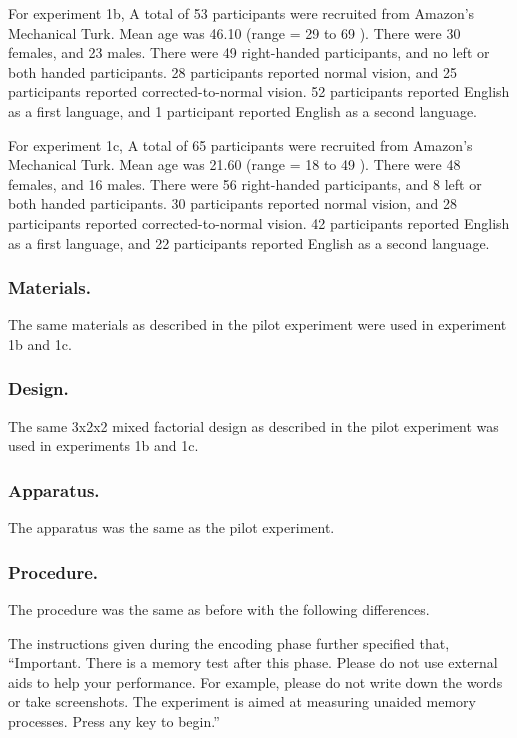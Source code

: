 \documentclass[
  man,floatsintext]{apa6}
\begin{document}
For experiment 1b, A total of 53 participants were recruited from Amazon's Mechanical Turk. Mean age was 46.10 (range = 29 to 69 ). There were 30 females, and 23 males. There were 49 right-handed participants, and no left or both handed participants. 28 participants reported normal vision, and 25 participants reported corrected-to-normal vision. 52 participants reported English as a first language, and 1 participant reported English as a second language.

For experiment 1c, A total of 65 participants were recruited from Amazon's Mechanical Turk. Mean age was 21.60 (range = 18 to 49 ). There were 48 females, and 16 males. There were 56 right-handed participants, and 8 left or both handed participants. 30 participants reported normal vision, and 28 participants reported corrected-to-normal vision. 42 participants reported English as a first language, and 22 participants reported English as a second language.

\hypertarget{materials.-1}{%
\subsubsection{Materials.}\label{materials.-1}}

The same materials as described in the pilot experiment were used in experiment 1b and 1c.

\hypertarget{design.-1}{%
\subsubsection{Design.}\label{design.-1}}

The same 3x2x2 mixed factorial design as described in the pilot experiment was used in experiments 1b and 1c.

\hypertarget{apparatus.-1}{%
\subsubsection{Apparatus.}\label{apparatus.-1}}

The apparatus was the same as the pilot experiment.

\hypertarget{procedure.-1}{%
\subsubsection{Procedure.}\label{procedure.-1}}

The procedure was the same as before with the following differences.

The instructions given during the encoding phase further specified that, ``Important. There is a memory test after this phase. Please do not use external aids to help your performance. For example, please do not write down the words or take screenshots. The experiment is aimed at measuring unaided memory processes. Press any key to begin.''
\end{document}
